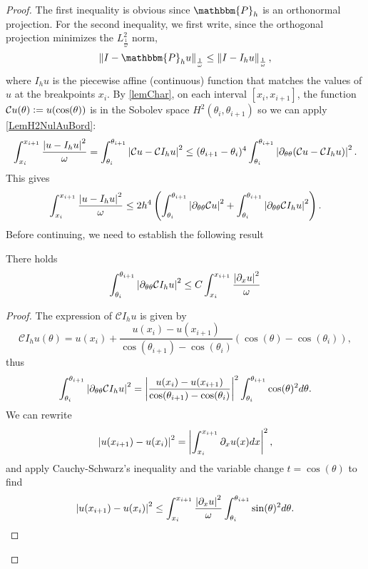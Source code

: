 \documentclass[a4paper]{article}
\begin{document}
\begin{proof}
	The first inequality is obvious since $\mathbbm{P}_h$ is an orthonormal projection. For the second inequality, we first write, since the orthogonal projection minimizes the $L^2_\frac{1}{\omega}$ norm,
	\begin{equation}
	\norm{I - \mathbbm{P}_h u}_{\frac{1}{\omega}} \leq \norm{I - I_h u}_{\frac{1}{\omega}},
	\label{estimProjParInterp}
	\end{equation}
	where $I_h u$ is the piecewise affine (continuous) function that matches the values of $u$ at the breakpoints $x_i$. By \autoref{lemChar}, on each interval $[x_i, x_{i+1}]$, the function $\mathcal{C}{u}(\theta) \mathrel{\mathop:}= u(\cos(\theta))$ is in the Sobolev space $H^2(\theta_i,\theta_{i+1})$ so we can apply \autoref{LemH2NulAuBord}:
	\[ \int_{x_i}^{x_{i+1}} \frac{\left\lvert u - I_h u \right\rvert^2}{\omega} = \int_{\theta_i}^{\theta_{i+1}} \left\lvert \mathcal{C}{u}- \mathcal{C}{I_h}u \right\rvert^2 \leq (\theta_{i+1} - \theta_i)^4 \int_{\theta_{i}}^{\theta_{i+1}} \left\lvert \partial_{\theta\theta}(\mathcal{C}{u} - \mathcal{C}{I_hu}) \right\rvert^2. \]
	This gives
	\begin{equation}
	\int_{x_i}^{x_{i+1}} \frac{\left\lvert u - I_h u \right\rvert^2}{\omega} \leq 2h^4 \left(\int_{\theta_i}^{\theta_{i+1}} \left\lvert \partial_{\theta\theta}\mathcal{C}{u} \right\rvert^2 + \int_{\theta_i}^{\theta_{i+1}} \left\lvert \partial_{\theta\theta}\mathcal{C}{I_h}u \right\rvert^2 \right).
	\label{enCoursDePreuve}
	\end{equation}
	Before continuing, we need to establish the following result
	\begin{Lem}
		There holds 
		\[ \int_{\theta_i}^{\theta_{i+1}} \left\lvert \partial_{\theta\theta}\mathcal{C}{I_hu} \right\rvert^2 \leq C \int_{x_i}^{x_{i+1}} \frac{\left\lvert \partial_xu \right\rvert^2}{\omega}\]
	\end{Lem}
	\begin{proof}
		The expression of $\mathcal{C}I_h u$ is given by
		\[\mathcal{C}{I_h u}(\theta) = u(x_i) + \frac{u(x_i) - u(x_{i+1})}{\cos(\theta_{i+1}) - \cos(\theta_i)} (\cos(\theta) - \cos(\theta_i)),\]
		thus
		\[\int_{\theta_i}^{\theta_{i+1}} \left\lvert \partial_{\theta\theta}\mathcal{C}{I_hu} \right\rvert^2 = \left\lvert \frac{u(x_i) - u(x_{i+1})}{\cos(\theta_{i+1}) - \cos(\theta_i)} \right\rvert^2 \int_{\theta_i}^{\theta_{i+1}} \cos(\theta)^2 d\theta.\]
		We can rewrite 
		\[\left\lvert u(x_{i+1}) - u(x_i) \right\rvert^2 = \left\lvert  \int_{x_i}^{x_{i+1}} \partial_xu(x)dx \right\rvert^2,\]
		and apply Cauchy-Schwarz's inequality and the variable change $t = \cos(\theta)$ to find 
		\[\left\lvert u(x_{i+1}) - u(x_i) \right\rvert^2 \leq \int_{x_i}^{x_{i+1}} \frac{\left\lvert \partial_x u \right\rvert^2}{\omega} \int_{\theta_i}^{\theta_{i+1}} \sin(\theta)^2 d\theta.\]

\end{proof}
\end{proof}
\end{document}
